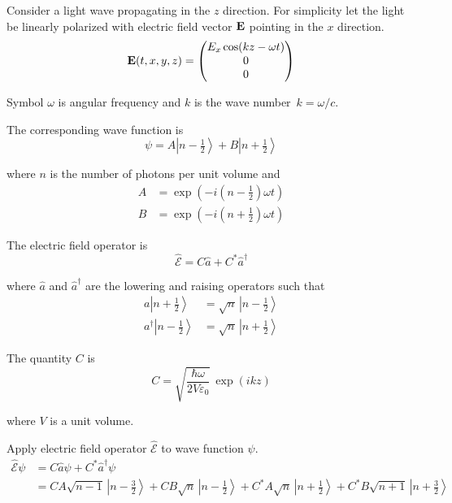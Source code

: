 \documentclass[12pt]{article}
\begin{document}
\noindent
Consider a light wave propagating in the $z$ direction.
For simplicity let the light be linearly polarized with electric
field vector $\bf E$ pointing in the $x$ direction.
\begin{equation*}
{\bf E}(t,x,y,z)=\begin{pmatrix}E_x\cos(kz-\omega t)\\0\\0\end{pmatrix}
\end{equation*}

\noindent
Symbol $\omega$ is angular frequency and $k$ is the wave number~$k=\omega/c$.

\bigskip
\noindent
The corresponding wave function is
\begin{equation*}
\psi=A\left|n-\tfrac{1}{2}\right\rangle
+B\left|n+\tfrac{1}{2}\right\rangle
\end{equation*}

\noindent
where $n$ is the number of photons per unit volume and
\begin{align*}
A&=\exp\left(-i\left(n-\tfrac{1}{2}\right)\omega t\right)\\
B&=\exp\left(-i\left(n+\tfrac{1}{2}\right)\omega t\right)
\end{align*}

\noindent
The electric field operator is
\begin{equation*}
\hat{\mathscr{E}}=C\hat{a}+C^*\hat{a}^\dagger
\end{equation*}

\noindent
where $\hat{a}$ and $\hat{a}^\dagger$ are the lowering and raising operators such that
\begin{align*}
a\left|n+\tfrac{1}{2}\right\rangle&=\sqrt{n}\,\left|n-\tfrac{1}{2}\right\rangle\\
a^\dagger\left|n-\tfrac{1}{2}\right\rangle&=\sqrt{n}\,\left|n+\tfrac{1}{2}\right\rangle
\end{align*}

\noindent
The quantity $C$ is
\begin{equation*}
C=\sqrt{\frac{\hbar\omega}{2V\varepsilon_0}}\,\exp(ikz)
\end{equation*}

\noindent
where $V$ is a unit volume.

\bigskip
\noindent
Apply electric field operator $\hat{\mathscr{E}}$ to wave function $\psi$.
\begin{align*}
\hat{\mathscr{E}}\psi
&=C\hat{a}\psi+C^*\hat{a}^\dagger\psi\\
&=CA\sqrt{n-1}\,\left|n-\tfrac{3}{2}\right\rangle+CB\sqrt{n}\,\left|n-\tfrac{1}{2}\right\rangle
+C^*A\sqrt{n}\,\left|n+\tfrac{1}{2}\right\rangle+C^*B\sqrt{n+1}\,\left|n+\tfrac{3}{2}\right\rangle
\end{align*}
\end{document}
